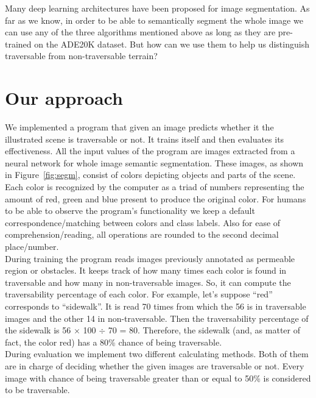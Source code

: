 \documentclass[12pt,a4paper]{report}
\newcommand{\alleg}{\enquote}
\newcommand{\acronym}{\MakeUppercase}
\begin{document}
	
	Many deep learning architectures have been proposed for image segmentation. As far as
	we know, in order to be able to semantically segment the whole image we can use any 
	of the three algorithms mentioned above as long as they are pre-trained on the 
	\acronym{ade20k} dataset. But how can we use them to help us distinguish traversable 
	from non-traversable terrain?
	\\
		
	\section{Our approach}
	\label{sec:fg:app}
	
	We implemented a program that given an image predicts whether it the illustrated scene 
	is traversable or not. It trains itself and then evaluates its effectiveness. All 
	the input values of the program are images extracted from a neural network for whole 
	image semantic segmentation. These images, as shown in Figure~\ref{fig:segm}, consist 
	of colors depicting objects and parts of the scene. Each color is recognized by the 
	computer as a triad of numbers representing the amount of red, green and blue present 
	to produce the original color. For humans to be able to observe the program's 
	functionality we keep a default correspondence/matching between colors and class labels. 
	Also for ease of comprehension/reading, all operations are rounded to the second decimal place/number.
	\\
	
	During training the program reads images previously annotated as permeable region or 
	obstacles. It keeps track of how many times 
	each color is found in traversable and how many in non-traversable images. So, it can 
	compute the traversability percentage of each color. For example, let's suppose \alleg{red} corresponds to \alleg{sidewalk}. It is read 70 times from which the 
	56 is in traversable images and the other 14 in non-traversable. Then the traversability 
	percentage of the sidewalk is 56 $\times$ 100 $\div$ 70 = 80. Therefore, the sidewalk 
	(and, as matter of fact, the color red)	has a 80\% chance of being traversable.
	\\
	
	During evaluation we implement two different calculating methods. Both of them are in 
	charge of deciding whether the given images are traversable or not. Every image with 
	chance of being traversable greater than or equal to 50\% is considered to be traversable.
	
\end{document}
